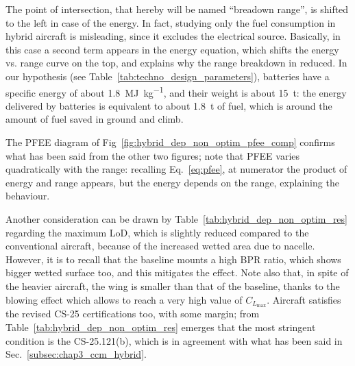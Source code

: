 The point of intersection, that hereby will be named ``breadown range'', is shifted to the left in case of the energy. 
In fact, studying only the fuel consumption in hybrid aircraft is misleading, since it excludes the electrical source.
Basically, in this case a second term appears in the energy equation, which shifts the energy vs. range curve on the top, and explains why the range breakdown in reduced. 
In our hypothesis (see Table~\ref{tab:techno_design_parameters}), batteries have a specific energy of about 1.8~\si{\mega\joule\per\kilogram}, and their weight is about 15~\si{\tonne}: the energy delivered by batteries is equivalent to about 1.8~\si{\tonne} of fuel, which is around the amount of fuel saved in ground and climb. 

The PFEE diagram of Fig~\ref{fig:hybrid_dep_non_optim_pfee_comp} confirms what has been said from the other two figures; note that PFEE varies quadratically with the range: recalling Eq.~\eqref{eq:pfee}, at numerator the product of energy and range appears, but the energy depends on the range, explaining the behaviour. 

Another consideration can be drawn by Table~\ref{tab:hybrid_dep_non_optim_res} regarding the maximum LoD, which is slightly reduced compared to the conventional aircraft, because of the increased wetted area due to nacelle.
However, it is to recall that the baseline mounts a high BPR ratio, which shows bigger wetted surface too, and this mitigates the effect. 
Note also that, in spite of the heavier aircraft, the wing is smaller than that of the baseline, thanks to the blowing effect which allows to reach a very high value of $C_{L_{\max}}$. 
Aircraft satisfies the revised CS-25 certifications too, with some margin; from Table~\ref{tab:hybrid_dep_non_optim_res} emerges that the most stringent condition is the CS-25.121(b), which is in agreement with what has been said in Sec.~\ref{subsec:chap3_ccm_hybrid}. 

